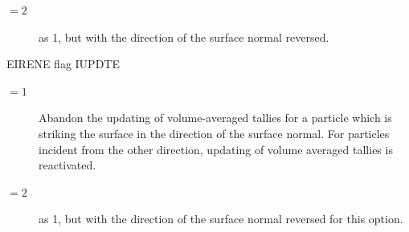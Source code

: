 \begin{description}
\begin{description}
\begin{description}
                  \item[$= 2$] as 1, but with the direction of the surface normal reversed.
                \end{description}
          \item[L] EIRENE flag IUPDTE
                \begin{description}
                  \item[$= 1$] Abandon the
                        updating of volume-averaged tallies for a particle which is striking the
                        surface in the direction of the surface normal.
                        For particles incident from the other direction, updating of volume averaged
                        tallies is reactivated.
                  \item[$= 2$] as 1, but with the direction of the surface normal reversed for
                        this option.
                \end{description}
        \end{description}


\end{description}

